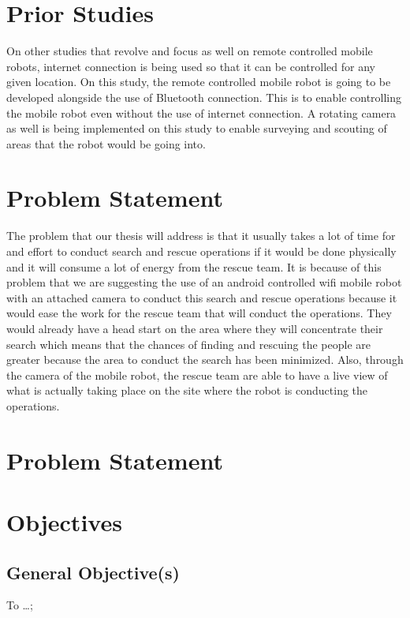 \section{Prior Studies}


	On other studies that revolve and focus as well on remote controlled mobile robots, internet connection is being used so that it can be controlled for any given location. On this study, the remote controlled mobile robot is going to be developed alongside the use of Bluetooth connection. This is to enable controlling the mobile robot even without the use of internet connection. A rotating camera as well is being implemented on this study to enable surveying and scouting of areas that the robot would be going into. 

\section{Problem Statement}

	The problem that our thesis will address is that it usually takes a lot of time for and effort to conduct search and rescue operations if it would be done physically and it will consume a lot of energy from the rescue team. It is because of this problem that we are suggesting the use of an android controlled wifi mobile robot with an attached camera to conduct this search and rescue operations because it would ease the work for the rescue team that will conduct the operations. They would already have a head start on the area where they will concentrate their search which means that the chances of finding and rescuing the people are greater because the area to conduct the search has been minimized. Also, through the camera of the mobile robot, the rescue team are able to have a live view of what is actually taking place on the site where the robot is conducting the operations.


\section{Problem Statement}
\blindtext




\section{Objectives}
\subsection{General Objective(s)}
To \ldots;

